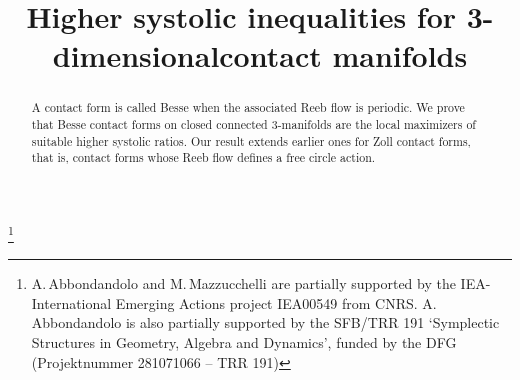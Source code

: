 \documentclass[JEP,XML,SOM,Unicode,published]{cedram}
\theoremstyle{definition}
\begin{document}
\frontmatter
\title[Higher systolic inequalities for 3-dimensional contact manifolds]{Higher systolic inequalities for 3-dimensional\nobreakspace contact manifolds}

\author[\initial{A.} \lastname{Abbondandolo}]{ }
\address{Ruhr Universität Bochum, Fakultät für Mathematik\\
Gebäude IB 3/65, D-44801 Bochum, Germany}

\author[\initial{C.} \lastname{Lange}]{ }
\address{Ludwig-Maximilians-Universität München, Mathematisches Institut\\
Theresienstra{\ss}e 39, D-80333 Munich, Germany}

\author[\initial{M.} \lastname{Mazzucchelli}]{\nobreakauthor {}}
\address{CNRS, UMPA, École Normale Supérieure de Lyon\\
46 allée d'Italie, 69364 Lyon, France}

\thanks{A.\,Abbondandolo and M.\,Mazzucchelli are partially supported by the IEA-International Emerging Actions project IEA00549 from CNRS. A.\,Abbondandolo is also partially supported by the SFB/TRR 191 `Symplectic Structures in Geometry, Algebra and Dynamics', funded by the DFG (Projektnummer 281071066 -- TRR 191)}



\begin{abstract}
A contact form is called Besse when the associated Reeb flow is periodic. We prove that Besse contact forms on closed connected $3$-manifolds are the local maximizers of suitable higher systolic ratios. Our result extends earlier ones for Zoll contact forms, that is, contact forms whose Reeb flow defines a free circle action.
\end{abstract}


\end{document}
